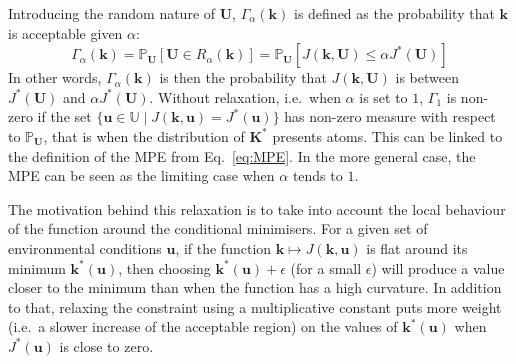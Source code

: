 \documentclass[preprint, 1p]{elsarticle}
\newcommand{\Prob}{\mathbb{P}}
\newcommand{\Uspace}{\mathbb{U}}
\begin{document}
Introducing the random nature of $\mathbf{U}$, $\Gamma_\alpha(\mathbf{k})$ is defined as the probability that $\mathbf{k}$ is acceptable given $\alpha$:
\begin{equation}
  \label{eq:def_Gamma}
  \Gamma_\alpha(\mathbf{k}) = \Prob_{\mathbf{U}}\left[\mathbf{U} \in R_\alpha(\mathbf{k})\right] = \Prob_{\mathbf{U}}\left[J(\mathbf{k},\mathbf{U}) \leq 
    \alpha J^*(\mathbf{U}) \right]
\end{equation}
In other words, $\Gamma_{\alpha}(\mathbf{k})$ is then the probability that $J(\mathbf{k},\mathbf{U})$ is between 
$J^*(\mathbf{U})$ and 
$\alpha J^*(\mathbf{U})$. Without relaxation, i.e.\ when $\alpha$ is set to $1$, $\Gamma_1$ is non-zero if the set $\{\mathbf{u}\in\Uspace \mid J(\mathbf{k},\mathbf{u}) = J^*(\mathbf{u})\}$ has non-zero measure with respect to $\Prob_{\mathbf{U}}$, that is when the distribution of $\mathbf{K}^*$ presents atoms. This can be linked to the definition of the MPE from Eq.~\eqref{eq:MPE}. In the more general case, the MPE can be seen as the limiting case when $\alpha$ tends to $1$.

The motivation behind this relaxation is to take into account the local behaviour of the function around the conditional minimisers.
For a given set of environmental conditions $\mathbf{u}$, if the function $\mathbf{k} \mapsto J(\mathbf{k},\mathbf{u})$ is flat around its minimum $\mathbf{k}^*(\mathbf{u})$, then choosing  $\mathbf{k}^*(\mathbf{u}) + \epsilon$ (for a small $\epsilon$) will produce a value closer to the minimum than when the function has a high curvature.
In addition to that, relaxing the constraint using a multiplicative constant puts more weight (i.e.\ a slower increase of the acceptable region) on the values of $\mathbf{k}^*(\mathbf{u})$ when $J^*(\mathbf{u})$ is close to zero.
\end{document}
